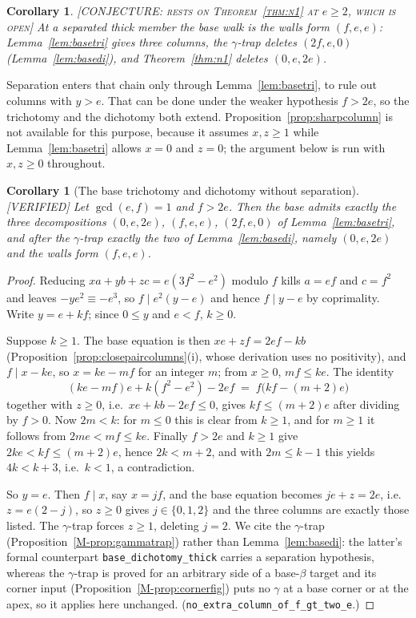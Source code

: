 \documentclass[11pt,reqno]{amsart}
\theoremstyle{plain}
\newtheorem{corollary}[theorem]{Corollary}
\theoremstyle{definition}
\newcommand{\lab}[1]{\hfill\textnormal{\footnotesize\textsc{[#1]}}}
\begin{document}
\begin{corollary}\label{cor:basewalls}\lab{CONJECTURE: rests on Theorem~\ref{thm:n1} at $e\ge2$, which is open}
At a separated thick member the base walk is the walls form $(f,e,e)$: Lemma~\ref{lem:basetri}
gives three columns, the $\gamma$-trap deletes $(2f,e,0)$ (Lemma~\ref{lem:basedi}), and
Theorem~\ref{thm:n1} deletes $(0,e,2e)$.
\end{corollary}

Separation enters that chain only through Lemma~\ref{lem:basetri}, to rule out columns with $y>e$.
That can be done under the weaker hypothesis $f>2e$, so the trichotomy and the dichotomy both
extend. Proposition~\ref{prop:sharpcolumn} is not available for this purpose, because it assumes
$x,z\ge1$ while Lemma~\ref{lem:basetri} allows $x=0$ and $z=0$; the argument below is run with
$x,z\ge0$ throughout.

\begin{corollary}[The base trichotomy and dichotomy without separation]\label{cor:basedi2e}\lab{VERIFIED}
Let $\gcd(e,f)=1$ and $f>2e$. Then the base admits exactly the three decompositions
$(0,e,2e)$, $(f,e,e)$, $(2f,e,0)$ of Lemma~\ref{lem:basetri}, and after the $\gamma$-trap exactly
the two of Lemma~\ref{lem:basedi}, namely $(0,e,2e)$ and the walls form $(f,e,e)$.
\end{corollary}

\begin{proof}
Reducing $xa+yb+zc=e(3f^2-e^2)$ modulo $f$ kills $a=ef$ and $c=f^2$ and leaves
$-ye^2\equiv-e^3$, so $f\mid e^2(y-e)$ and hence $f\mid y-e$ by coprimality. Write $y=e+kf$; since
$0\le y$ and $e<f$, $k\ge0$.

Suppose $k\ge1$. The base equation is then $xe+zf=2ef-kb$ (Proposition~\ref{prop:closepaircolumns}(i),
whose derivation uses no positivity), and $f\mid x-ke$, so $x=ke-mf$ for an integer $m$; from $x\ge0$,
$mf\le ke$. The identity
\[
(ke-mf)e+k(f^2-e^2)-2ef \;=\; f\bigl(kf-(m+2)e\bigr)
\]
together with $z\ge0$, i.e.\ $xe+kb-2ef\le0$, gives $kf\le(m+2)e$ after dividing by $f>0$. Now
$2m<k$: for $m\le0$ this is clear from $k\ge1$, and for $m\ge1$ it follows from
$2me<mf\le ke$. Finally $f>2e$ and $k\ge1$ give $2ke<kf\le(m+2)e$, hence $2k<m+2$, and with
$2m\le k-1$ this yields $4k<k+3$, i.e.\ $k<1$, a contradiction.

So $y=e$. Then $f\mid x$, say $x=jf$, and the base equation becomes $je+z=2e$, i.e.\
$z=e(2-j)$, so $z\ge0$ gives $j\in\{0,1,2\}$ and the three columns are exactly those listed. The
$\gamma$-trap forces $z\ge1$, deleting $j=2$. We cite the $\gamma$-trap
(Proposition~\ref{M-prop:gammatrap}) rather than Lemma~\ref{lem:basedi}: the latter's formal
counterpart \texttt{base\_dichotomy\_thick} carries a separation hypothesis, whereas the
$\gamma$-trap is proved for an arbitrary side of a base-$\beta$ target and its corner input
(Proposition~\ref{M-prop:cornerfig}) puts no $\gamma$ at a base corner or at the apex, so it applies
here unchanged.
\textup{(\texttt{no\_extra\_column\_of\_f\_gt\_two\_e}.)}
\end{proof}
\end{document}
